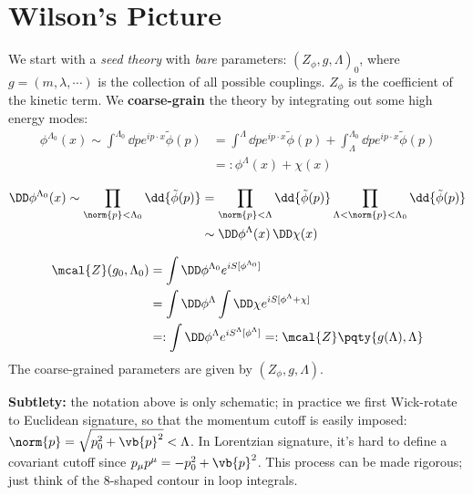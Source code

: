 \documentclass[a4paper
	,10pt
]{article}
\begin{document}
\pagebreak[4]

\section{Wilson's Picture}
	We start with a \textit{seed theory} with \textit{bare} parameters: $(Z_\phi,g,\Lambda)_0$, where $g = (m,\lambda,\cdots)$ is the collection of all possible couplings. $Z_\phi$ is the coefficient of the kinetic term.
	We \textbf{coarse-grain} the theory by integrating out some high energy modes:
	\begin{equation}
	\begin{aligned}
	  \phi^{\Lambda_0}(x)
	  \sim \int^{\Lambda_0} \dd{p}
	    e^{ip\cdot x}
	    \tilde{\phi}(p)
	  &= \int^{\Lambda} \dd{p}
	    e^{ip\cdot x}
	    \tilde{\phi}(p)
	    + \int_{\Lambda}^{\Lambda_0} \dd{p}
	    e^{ip\cdot x}
	    \tilde{\phi}(p) \\
	  &=\colon \phi^{\Lambda}(x) + \chi(x)
	\end{aligned}
	\end{equation}
	
	\begin{equation}
	\begin{aligned}
	  \DD\phi^{\Lambda_0}(x)
	  \sim \prod_{\norm{p} < \Lambda_0}
	    \dd{\tilde{\phi}(p)}
	  &= \prod_{\norm{p} < \Lambda}
	    \dd{\tilde{\phi}(p)}
	    \prod_{\Lambda < \norm{p} < \Lambda_0}
	    \dd{\tilde{\phi}(p)} \\
	  &\sim
	    \DD\phi^{\Lambda}(x)\,
	    \DD\chi(x)
	\end{aligned}
	\end{equation}
	
	\begin{equation}
	\begin{aligned}
	  \mcal{Z} (g_0,\Lambda_0)
	  &= \int \DD\phi^{\Lambda_0}
	      e^{iS[\phi^{\Lambda_0}]} \\
	  &= \int \DD\phi^{\Lambda}
	    \int \DD\chi
	      e^{iS[\phi^\Lambda + \chi]} \\
	  &=: \int \DD\phi^{\Lambda}
	      e^{iS^\Lambda [\phi^\Lambda]}
	  =: \mcal{Z}\pqty{g(\Lambda),\Lambda}
	\end{aligned}
	\end{equation}
	The coarse-grained parameters are given by $(Z_\phi,g,\Lambda)$.
	
	\textbf{Subtlety:} the notation above is only schematic; in practice we
	first Wick-rotate to Euclidean signature, so that the momentum cutoff is
	easily imposed: $\norm{p} = \sqrt{p_0^2 + \vb{p}^2} < \Lambda$. In
	Lorentzian signature, it's hard to define a covariant cutoff since
	$p_\mu p^\mu = - p_0^2 + \vb{p}^2$. This process can be made rigorous;
	just think of the 8-shaped contour in loop integrals.
	
\end{document}
